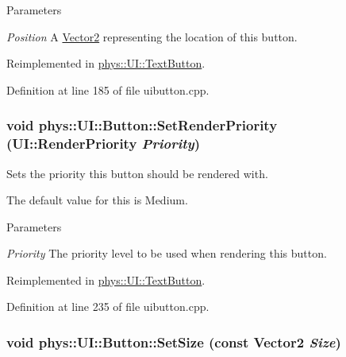 \begin{DoxyParams}{Parameters}
\item[{\em Position}]A \hyperlink{classphys_1_1Vector2}{Vector2} representing the location of this button. \end{DoxyParams}


Reimplemented in \hyperlink{classphys_1_1UI_1_1TextButton_acf40fd3a8382cdfc959d078e99f6ff0b}{phys::UI::TextButton}.



Definition at line 185 of file uibutton.cpp.

\hypertarget{classphys_1_1UI_1_1Button_a569053caa70448d560fd016d86ef52cb}{
\subsubsection[{SetRenderPriority}]{\setlength{\rightskip}{0pt plus 5cm}void phys::UI::Button::SetRenderPriority (UI::RenderPriority {\em Priority})}}
\label{d8/d88/classphys_1_1UI_1_1Button_a569053caa70448d560fd016d86ef52cb}


Sets the priority this button should be rendered with. 

The default value for this is Medium. 
\begin{DoxyParams}{Parameters}
\item[{\em Priority}]The priority level to be used when rendering this button. \end{DoxyParams}


Reimplemented in \hyperlink{classphys_1_1UI_1_1TextButton_a7d4e22acd792b10f2f7986d8f449ec16}{phys::UI::TextButton}.



Definition at line 235 of file uibutton.cpp.

\hypertarget{classphys_1_1UI_1_1Button_a06e6526a15b3f8bb6e63c70ac7b02134}{
\subsubsection[{SetSize}]{\setlength{\rightskip}{0pt plus 5cm}void phys::UI::Button::SetSize (const {\bf Vector2} {\em Size})}}
\label{d8/d88/classphys_1_1UI_1_1Button_a06e6526a15b3f8bb6e63c70ac7b02134}


